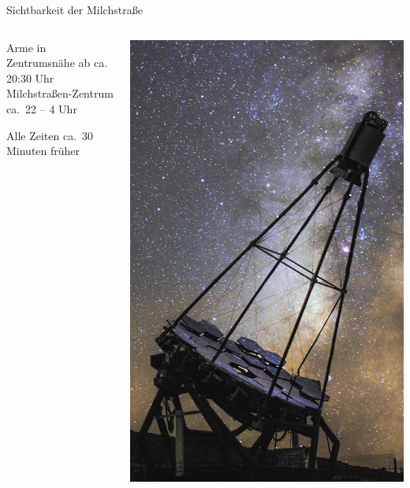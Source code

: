 \begin{frame}{Sichtbarkeit der Milchstraße}
  \begin{columns}[c, onlytextwidth]
    \begin{column}{0.65\textwidth}
      \begin{description}[15.6.2015]
        \item[1.6.2015] Arme in Zentrumsnähe ab ca. 20:30 Uhr \\
          Milchstraßen-Zentrum ca.\  22 – 4 Uhr
        \item[15.6.2015] Alle Zeiten ca.\ 30 Minuten früher
      \end{description}
    \end{column}
    \begin{column}{0.3\textwidth}
      \includegraphics[width=\linewidth]{images/fact_crop.jpg}
    \end{column}
  \end{columns}
\end{frame}

